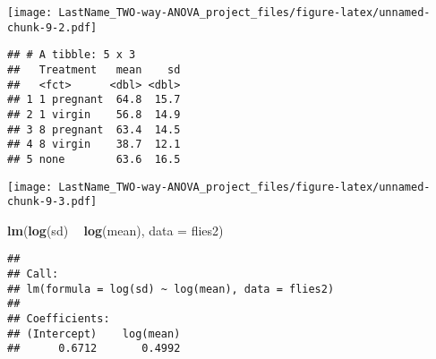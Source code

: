 \documentclass[]{article}
\newenvironment{Shaded}{\begin{snugshade}}{\end{snugshade}}
\newcommand{\DataTypeTok}[1]{\textcolor[rgb]{0.13,0.29,0.53}{#1}}
\newcommand{\KeywordTok}[1]{\textcolor[rgb]{0.13,0.29,0.53}{\textbf{#1}}}
\newcommand{\NormalTok}[1]{#1}
\newcommand{\OperatorTok}[1]{\textcolor[rgb]{0.81,0.36,0.00}{\textbf{#1}}}
\newcommand{\StringTok}[1]{\textcolor[rgb]{0.31,0.60,0.02}{#1}}
\begin{document}
\texttt{[image: LastName\_TWO-way-ANOVA\_project\_files/figure-latex/unnamed-chunk-9-2.pdf]}

\begin{Shaded}
\end{Shaded}

\begin{verbatim}
## # A tibble: 5 x 3
##   Treatment   mean    sd
##   <fct>      <dbl> <dbl>
## 1 1 pregnant  64.8  15.7
## 2 1 virgin    56.8  14.9
## 3 8 pregnant  63.4  14.5
## 4 8 virgin    38.7  12.1
## 5 none        63.6  16.5
\end{verbatim}

\begin{Shaded}
\end{Shaded}

\texttt{[image: LastName\_TWO-way-ANOVA\_project\_files/figure-latex/unnamed-chunk-9-3.pdf]}

\begin{Shaded}
\begin{Highlighting}[]
\KeywordTok{lm}\NormalTok{(}\KeywordTok{log}\NormalTok{(sd) }\OperatorTok{~}\StringTok{ }\KeywordTok{log}\NormalTok{(mean), }\DataTypeTok{data =}\NormalTok{ flies2)}
\end{Highlighting}
\end{Shaded}

\begin{verbatim}
## 
## Call:
## lm(formula = log(sd) ~ log(mean), data = flies2)
## 
## Coefficients:
## (Intercept)    log(mean)  
##      0.6712       0.4992
\end{verbatim}
\end{document}

